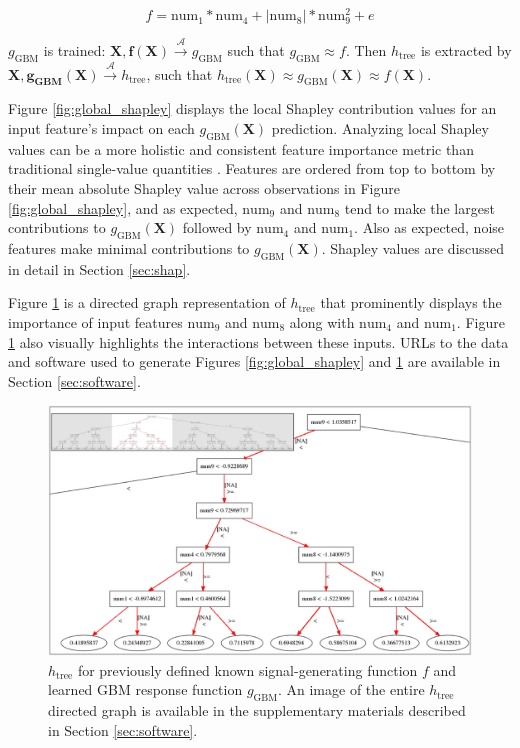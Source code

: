 \documentclass[11pt]{asaproc}
\begin{document}
\begin{equation}
\label{eq:f}
f = \text{num} _1 * \text{num}_4 + |\text{num}_8| * \text{num}_9^2 + e
\end{equation}

\noindent$g_{\text{GBM}}$ is trained: $ \mathbf{X}, \mathbf{f(X)} \xrightarrow{\mathcal{A}} g_{\text{GBM}}$ such that $g_{\text{GBM}} \approx f$. Then $h_{\text{tree}}$ is extracted by $\mathbf{X}, \mathbf{g_{\text{GBM}}(X)} \xrightarrow{\mathcal{A}} h_{\text{tree}}$, such that $h_{\text{tree}}(\mathbf{X}) \approx g_{\text{GBM}}(\mathbf{X}) \approx f(\mathbf{X})$.

Figure \ref{fig:global_shapley} displays the local Shapley contribution values for an input feature's impact on each $g_{\text{GBM}}(\mathbf{X})$ prediction. Analyzing local Shapley values can be a more holistic and consistent feature importance metric than traditional single-value quantities \cite{shapley}. Features are ordered from top to bottom by their mean absolute Shapley value across observations in Figure \ref{fig:global_shapley}, and as expected, $\text{num}_9$ and $\text{num}_8$ tend to make the largest contributions to $g_{\text{GBM}}(\mathbf{X})$ followed by $\text{num}_4$ and $\text{num}_1$. Also as expected, noise features make minimal contributions to $g_{\text{GBM}}(\mathbf{X})$. Shapley values are discussed in detail in Section \ref{sec:shap}.

Figure \ref{fig:dt_surrogate} is a directed graph representation of $h_{\text{tree}}$ that prominently displays the importance of input features $\text{num}_9$ and $\text{num}_8$ along with $\text{num}_4$ and $\text{num}_1$. Figure \ref{fig:dt_surrogate} also visually highlights the interactions between these inputs. URLs to the data and software used to generate Figures \ref{fig:global_shapley} and \ref{fig:dt_surrogate} are available in Section \ref{sec:software}.

\begin{figure}[htb]
	\begin{center}
		\includegraphics[scale=0.3]{img/figure_3.eps}
		\caption{$h_{\text{tree}}$ for previously defined known signal-generating function $f$ and learned GBM response function $g_{\text{GBM}}$. An image of the entire $h_{\text{tree}}$ directed graph is available in the supplementary materials described in Section \ref{sec:software}.}
		\label{fig:dt_surrogate}
	\end{center}
\end{figure}
\end{document}
